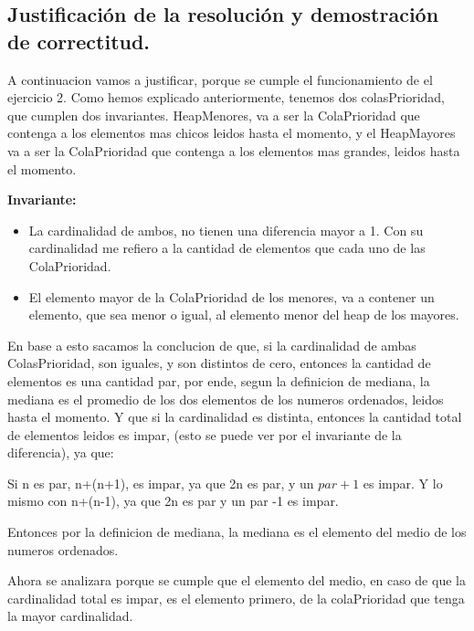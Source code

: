 \newpage
\subsection{Justificación de la resolución y demostración de correctitud.}

\vspace*{0.3cm}

A continuacion vamos a justificar, porque se cumple el funcionamiento de el ejercicio 2.
Como hemos explicado anteriormente, tenemos dos colasPrioridad, que cumplen dos invariantes. HeapMenores, va a ser la ColaPrioridad que contenga a los elementos mas chicos leidos hasta el momento, y el HeapMayores va a ser la ColaPrioridad que contenga a los elementos mas grandes, leidos hasta el momento. \newline 

\textbf{Invariante: }
\begin{itemize}
    \item La cardinalidad de ambos, no tienen una diferencia mayor a 1. Con su cardinalidad me refiero a la cantidad de elementos que cada uno de las ColaPrioridad. %
    \item El elemento mayor de la ColaPrioridad de los menores, va a contener un elemento, que sea menor o igual, al elemento menor del heap de los mayores.
\end{itemize}

En base a esto sacamos la conclucion de que, si la cardinalidad de ambas ColasPrioridad, son iguales, y son distintos de cero, entonces la cantidad de elementos es una cantidad par, por ende, segun la definicion de mediana, la mediana es el promedio de los dos elementos de los numeros ordenados, leidos hasta el momento. \newline
Y que si la cardinalidad es distinta, entonces la cantidad total de elementos leidos es impar, (esto se puede ver por el invariante de la diferencia), ya que: \newline

Si n es par, n+(n+1), es impar, ya que 2n es par, y un $par + 1$ es impar. \newline
Y lo mismo con n+(n-1), ya que 2n es par y un par -1 es impar.	\newline

Entonces por la definicion de mediana, la mediana es el elemento del medio de los numeros ordenados.

Ahora se analizara porque se cumple que el elemento del medio, en caso de que la cardinalidad total es impar, es el elemento primero, de la colaPrioridad que tenga la mayor cardinalidad.

